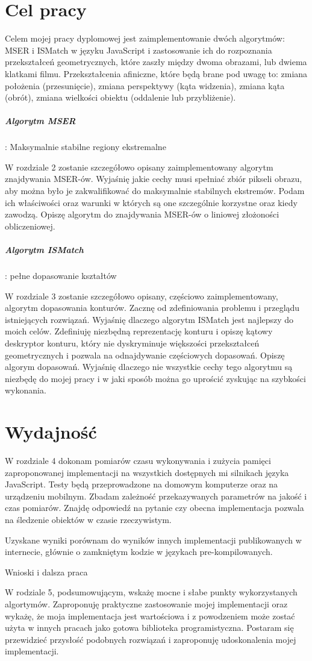 \documentclass[a4paper,12pt,polski]{report}
\begin{document}
\section{Cel pracy}

Celem mojej pracy dyplomowej jest zaimplementowanie dwóch algorytmów: MSER i
ISMatch w języku JavaScript i zastosowanie ich do rozpoznania przekształceń
geometrycznych, które zaszły między dwoma obrazami, lub dwiema klatkami filmu.
Przekształcenia afiniczne, które będą brane pod uwagę to: zmiana położenia
(przesunięcie), zmiana perspektywy (kąta widzenia), zmiana kąta (obrót), zmiana
wielkości obiektu (oddalenie lub przybliżenie).

\subparagraph{Algorytm MSER}: Maksymalnie stabilne regiony ekstremalne

W rozdziale 2 zostanie szczegółowo opisany zaimplementowany algorytm
znajdywania MSER-ów. Wyjaśnię jakie cechy musi spełniać zbiór pikseli obrazu,
aby można było je zakwalifikować do maksymalnie stabilnych ekstremów.  Podam
ich właściwości oraz warunki w których są one szczególnie korzystne oraz kiedy
zawodzą. Opiszę algorytm do znajdywania MSER-ów o liniowej złożoności
obliczeniowej.

\subparagraph{Algorytm ISMatch}: pełne dopasowanie kształtów

W rozdziale 3 zostanie szczegółowo opisany, częściowo zaimplementowany,
algorytm dopasowania konturów. Zacznę od zdefiniowania problemu i przeglądu
istniejących rozwiązań. Wyjaśnię dlaczego algorytm ISMatch jest najlepszy do
moich celów. Zdefiniuję niezbędną reprezentację konturu i opiszę kątowy
deskryptor konturu, który nie dyskryminuje większości przekształceń
geometrycznych i pozwala na odnajdywanie częściowych dopasowań. Opiszę algorym
dopasowań.  Wyjaśnię dlaczego nie wszystkie cechy tego algorytmu są niezbędę do
mojej pracy i w jaki sposób można go uprościć zyskując na szybkości wykonania.

\section{Wydajność}

W rozdziale 4 dokonam pomiarów czasu wykonywania i zużycia pamięci
zaproponowanej implementacji na wszystkich dostępnych mi silnikach języka
JavaScript. Testy będą przeprowadzone na domowym komputerze oraz na urządzeniu
mobilnym.  Zbadam zależność przekazywanych parametrów na jakość i czas
pomiarów. Znajdę odpowiedź na pytanie czy obecna implementacja pozwala na
śledzenie obiektów w czasie rzeczywistym.

Uzyskane wyniki porównam do wyników innych implementacji publikowanych w
internecie, głównie o zamkniętym kodzie w językach pre-kompilowanych.

Wnioski i dalsza praca

W rodziale 5, podsumowującym, wskażę mocne i słabe punkty wykorzystanych
algortymów. Zaproponuję praktyczne zastosowanie mojej implementacji oraz
wykażę, że moja implementacja jest wartościowa i z powodzeniem może zostać
użyta w innych pracach jako gotowa biblioteka programistyczna. Postaram się
przewidzieć przysłość podobnych rozwiązań i zaproponuję udoskonalenia mojej
implementacji.
\end{document}

